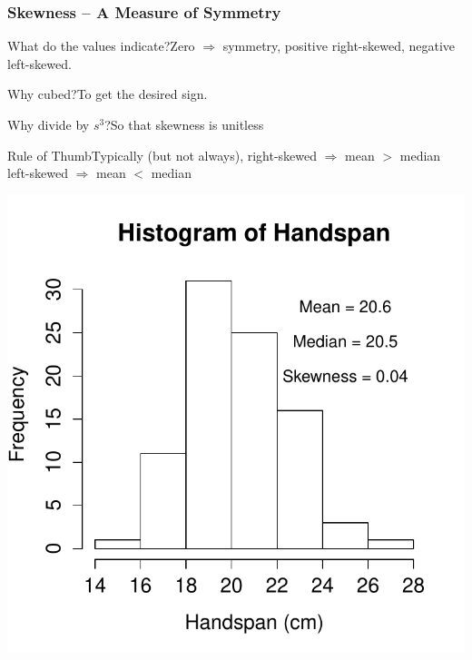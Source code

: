 \begin{frame}

\frametitle{Skewness -- A Measure of Symmetry}

\begin{center}
\end{center}
\pause
\begin{block}{What do the values indicate?}Zero $\Rightarrow$ symmetry, positive right-skewed, negative left-skewed.\end{block} \pause
\begin{block}{Why cubed?}To get the desired sign.\end{block} \pause
\begin{block}{Why divide by $s^3$?}So that skewness is unitless\end{block}\pause
\begin{block}{Rule of Thumb}Typically (but not always), right-skewed $\Rightarrow$ mean $>$ median\\ left-skewed $\Rightarrow$ mean $<$ median\end{block}

\end{frame}




\begin{frame}
\centering \includegraphics[scale = 0.75]{./images/handspan_skew}


\end{frame}


